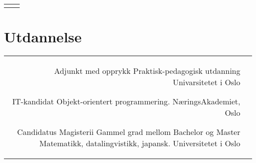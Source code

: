\documentclass[10pt]{article} %
\begin{document}
\begin{paracol}{2}
\begin{supertabular}{rl}
	
\end{supertabular}





\section{Utdannelse} 





\begin{supertabular}{rl} %

	
	{Adjunkt med opprykk} %
	{Praktisk-pedagogisk utdanning} %
	{} %
	{Univarsitetet i Oslo} %
	
	{IT-kandidat} %
	{} %
	{Objekt-orientert programmering.} %
	{NæringsAkademiet, Oslo} %
	
	{Candidatus Magisterii} %
	{Gammel grad mellom Bachelor og Master} %
	{Matematikk, datalingvistikk, japansk.} %
	{Universitetet i Oslo} %
	


\end{supertabular}




\end{paracol}
\end{document}
